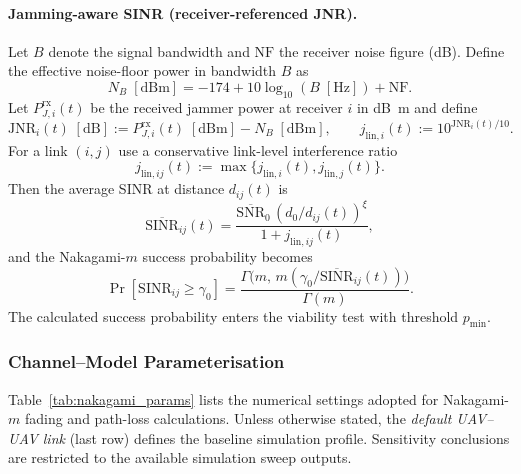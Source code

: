 \documentclass[preprint,12pt]{elsarticle}
\newcommand{\plExp}{\xi}
\theoremstyle{definition}\newtheorem{definition}{Definition}
\theoremstyle{plain}\newtheorem{theorem}{Theorem}
\theoremstyle{plain}\newtheorem{lemma}{Lemma}
\theoremstyle{plain}\newtheorem{corollary}{Corollary}
\theoremstyle{plain}\newtheorem{assumption}{Assumption}
\theoremstyle{remark}\newtheorem{remark}[theorem]{Remark}
\newcommand{\JNR}{\mathrm{JNR}}
\newcommand{\NF}{\mathrm{NF}}
\newcommand{\NB}{N_B}
\begin{document}
\paragraph{Jamming-aware SINR (receiver-referenced JNR).}
Let $B$ denote the signal bandwidth and $\NF$ the receiver noise figure (dB).
Define the effective noise-floor power in bandwidth $B$ as
\[
  \NB\;[\mathrm{dBm}] = -174 + 10\log_{10}(B\;[\mathrm{Hz}]) + \NF .
\]
Let $P^{\mathrm{rx}}_{J,i}(t)$ be the received jammer power at receiver $i$ in \si{\deci\bel m} and define
\[
\JNR_i(t)\;[\mathrm{dB}] := P^{\mathrm{rx}}_{J,i}(t)\;[\mathrm{dBm}] - \NB\;[\mathrm{dBm}],
  \qquad
  j_{\mathrm{lin},i}(t) := 10^{\JNR_i(t)/10}.
\]
For a link $(i,j)$ use a conservative link-level interference ratio
\[
  j_{\mathrm{lin},ij}(t) := \max\{j_{\mathrm{lin},i}(t), j_{\mathrm{lin},j}(t)\}.
\]
Then the average SINR at distance $d_{ij}(t)$ is
\[
  \overline{\mathrm{SINR}}_{ij}(t)=
  \frac{\overline{\mathrm{SNR}}_0\,(d_0/d_{ij}(t))^{\plExp}}{1+j_{\mathrm{lin},ij}(t)},
\]
and the Nakagami-$m$ success probability becomes
\[
  \Pr[\mathrm{SINR}_{ij}\ge\gamma_0] =
  \frac{\Gamma\!\bigl(m,\,m(\gamma_0/\overline{\mathrm{SINR}}_{ij}(t))\bigr)}{\Gamma(m)}.
\]
The calculated success probability enters the viability test with threshold $p_{\min}$.


\subsubsection*{Channel–Model Parameterisation}

Table~\ref{tab:nakagami_params} lists the numerical settings adopted for Nakagami-$m$ fading and path-loss calculations.  
Unless otherwise stated, the \emph{default UAV--UAV link} (last row) defines the baseline simulation profile. Sensitivity conclusions are restricted to the available simulation sweep outputs.
\end{document}
